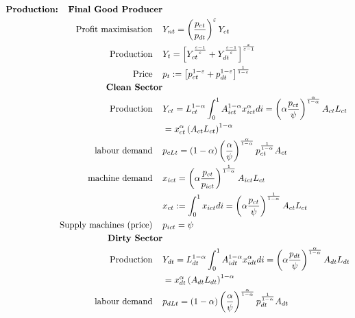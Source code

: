 \begin{align*}
\text{\textbf{Production:}} \hspace{4mm}
\text{\textbf{Final Good Producer}}&\\
\text{Profit maximisation}\hspace{4mm} & Y_{nt}=\left(\frac{p_{ct}}{p_{dt}}\right)^\varepsilon Y_{ct}\\
\text{Production}\hspace{4mm} & Y_t=\left[Y_{ct}^{\frac{\varepsilon-1}{\varepsilon}}+Y_{dt}^{\frac{\varepsilon-1}{\varepsilon}}\right]^{\frac{\varepsilon}{\varepsilon-1}}\\
\text{Price}\hspace{4mm}& p_t:=\left[p_{ct}^{1-\varepsilon}+p_{dt}^{1-\varepsilon}\right]^{\frac{1}{1-\varepsilon}}\\
\text{\textbf{Clean Sector}}\\
\text{Production}\hspace{4mm}& Y_{ct}=L^{1-\alpha}_{ct}\int_{0}^{1}A^{1-\alpha}_{ict}x_{ict}^{\alpha}di=  \left(\alpha\frac{p_{ct}}{\psi}\right)^{\frac{\alpha}{1-\alpha}}A_{ct} L_{ct}
\\ & =x_{ct}^{\alpha}\left(A_{ct}L_{ct}\right)^{1-\alpha} \\ 
\text{labour demand}\hspace{4mm} & p_{cLt} =
(1-\alpha)\left(\frac{\alpha}{\psi}\right)^\frac{\alpha}{1- \alpha}p_{ct}^\frac{1}{1-\alpha}A_{ct}\\
\text{machine demand}\hspace{4mm} & x_{ict} = \left(\alpha\frac{ p_{ct}}{p_{ict}}\right)^\frac{1}{1-\alpha}A_{ict}L_{ct}\\
& x_{ct}:=\int_{0}^{1}x_{ict} di= \left(\alpha\frac{p_{ct}}{\psi}\right)^\frac{1}{1-\alpha}A_{ct}L_{ct}\\
%
\text{Supply machines (price)}\hspace{4mm}& p_{ict}=\psi \\
%
\text{\textbf{Dirty Sector}}\\
\text{Production}\hspace{4mm} & Y_{dt}=L^{1-\alpha}_{dt}\int_{0}^{1}A^{1-\alpha}_{idt}x_{idt}^{\alpha}di=  \left(\alpha\frac{p_{dt}}{\psi}\right)^{\frac{\alpha}{1-\alpha}}A_{dt} L_{dt}\\ & =x_{dt}^{\alpha}\left(A_{dt}L_{dt}\right)^{1-\alpha} \\ 
\text{labour demand}\hspace{4mm} & p_{dLt} =
(1-\alpha)\left(\frac{\alpha}{\psi}\right)^\frac{\alpha}{1- \alpha}p_{dt}^\frac{1}{1-\alpha}A_{dt}\\

\end{align*}
